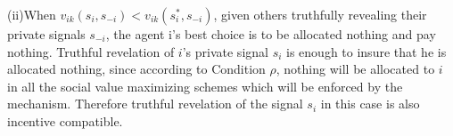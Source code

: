(ii)When $v_{ik}(s_i, s_{-i})< v_{ik}(s_i^*, s_{-i})$, given others
truthfully revealing their private signals $s_{-i}$, the agent i's
best choice is to be allocated nothing and pay nothing. Truthful
revelation of $i$'s private signal $s_i$ is enough to insure that he
is allocated nothing, since according to Condition $\rho$, nothing
will be allocated to $i$ in all the social value maximizing schemes
which will be enforced by the mechanism. Therefore truthful revelation
of the signal $s_i$ in this case is also incentive compatible.
